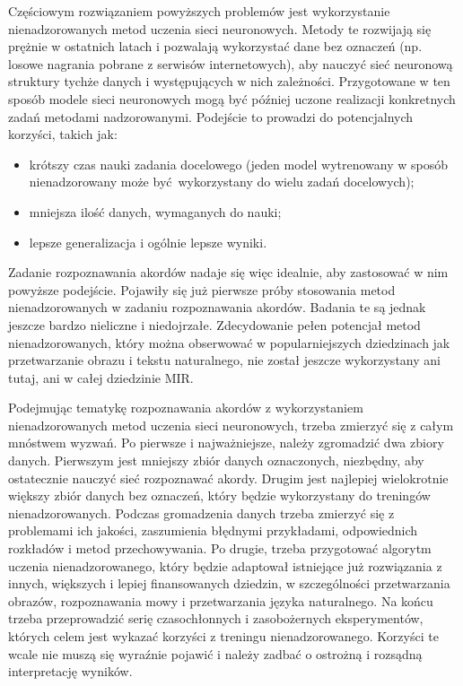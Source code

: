 Częściowym rozwiązaniem powyższych problemów jest wykorzystanie nienadzorowanych metod uczenia sieci neuronowych. Metody te rozwijają się prężnie w ostatnich latach i pozwalają wykorzystać dane bez oznaczeń (np. losowe nagrania pobrane z serwisów internetowych), aby nauczyć sieć neuronową struktury tychże danych i występujących w nich zależności. Przygotowane w ten sposób modele sieci neuronowych mogą być później uczone realizacji konkretnych zadań metodami nadzorowanymi. Podejście to prowadzi do potencjalnych korzyści, takich jak:
\begin{itemize}
    \item krótszy czas nauki zadania docelowego (jeden model wytrenowany w sposób nienadzorowany może być wykorzystany do wielu zadań docelowych);
    \item mniejsza ilość danych, wymaganych do nauki;
    \item lepsze generalizacja i ogólnie lepsze wyniki.
\end{itemize}
Zadanie rozpoznawania akordów nadaje się więc idealnie, aby zastosować w nim powyższe podejście. Pojawiły się już pierwsze próby stosowania metod nienadzorowanych w zadaniu rozpoznawania akordów. Badania te są jednak jeszcze bardzo nieliczne i niedojrzałe. Zdecydowanie pełen potencjał metod nienadzorowanych, który można obserwować w popularniejszych dziedzinach jak przetwarzanie obrazu i tekstu naturalnego, nie został jeszcze wykorzystany ani tutaj, ani w całej dziedzinie MIR.

Podejmując tematykę rozpoznawania akordów z wykorzystaniem nienadzorowanych metod uczenia sieci neuronowych, trzeba zmierzyć się z całym mnóstwem wyzwań. Po pierwsze i najważniejsze, należy zgromadzić dwa zbiory danych. Pierwszym jest mniejszy zbiór danych oznaczonych, niezbędny, aby ostatecznie nauczyć sieć rozpoznawać akordy. Drugim jest najlepiej wielokrotnie większy zbiór danych bez oznaczeń, który będzie wykorzystany do treningów nienadzorowanych. Podczas gromadzenia danych trzeba zmierzyć się z problemami ich jakości, zaszumienia błędnymi przykładami, odpowiednich rozkładów i metod przechowywania. Po drugie, trzeba przygotować algorytm uczenia nienadzorowanego, który będzie adaptował istniejące już rozwiązania z innych, większych i lepiej finansowanych dziedzin, w szczególności przetwarzania obrazów, rozpoznawania mowy i przetwarzania języka naturalnego. Na końcu trzeba przeprowadzić serię czasochłonnych i zasobożernych eksperymentów, których celem jest wykazać korzyści z treningu nienadzorowanego. Korzyści te wcale nie muszą się wyraźnie pojawić i należy zadbać o ostrożną i rozsądną interpretację wyników.

